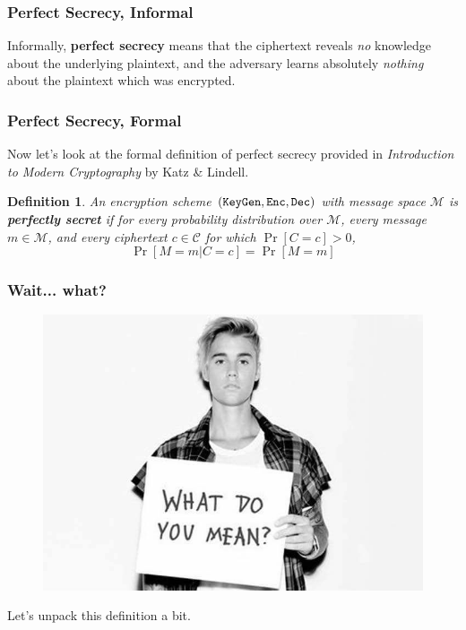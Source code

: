 \documentclass{beamer}
\newtheorem{defn}{Definition}[section]
\newcommand{\<}{\langle}
\renewcommand{\>}{\rangle}
\begin{document}
\begin{frame}
\frametitle{Perfect Secrecy, Informal}

Informally, \textbf{perfect secrecy} means that the ciphertext reveals \emph{no} knowledge about the underlying plaintext, and the adversary learns absolutely \emph{nothing} about the plaintext which was encrypted.
\end{frame}


\begin{frame}[fragile]
\frametitle{Perfect Secrecy, Formal}

\small
Now let's look at the formal definition of perfect secrecy provided in \emph{Introduction to Modern Cryptography} by Katz \& Lindell. \newline

\normalsize
\begin{defn}
An encryption scheme $(\verb|KeyGen|, \verb|Enc|, \verb|Dec|)$ with message space $\mathcal M$ is \textbf{perfectly secret} if for every probability distribution over $\mathcal M$, every message $m\in \mathcal M$, and every ciphertext $c\in\mathcal C$ for which $\Pr[C = c] >0$, 
\[
\Pr[M=m | C=c] = \Pr[M=m]
\]
\end{defn}
\end{frame}

\begin{frame}
\frametitle{Wait... what?}
\begin{figure}
\includegraphics[scale=.3]{IMG/whatdoumean}
\end{figure}

Let's unpack this definition a bit.
\end{frame}
\end{document}
